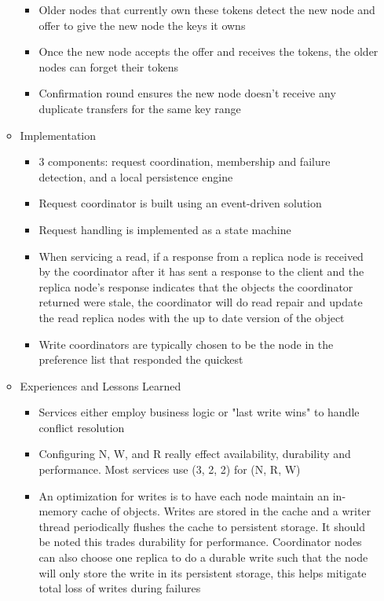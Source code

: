 \documentclass[a4paper]{article}
\begin{document}
\begin{itemize}
\begin{itemize}
\begin{itemize}
\item Older nodes that currently own these tokens detect the new node and offer to give the new node the keys it owns

\item Once the new node accepts the offer and receives the tokens, the older nodes can forget their tokens

\item Confirmation round ensures the new node doesn't receive any duplicate transfers for the same key range
\end{itemize}

\item Implementation
\begin{itemize}
\item 3 components: request coordination, membership and failure detection, and a local persistence engine

\item Request coordinator is built using an event-driven solution

\item Request handling is implemented as a state machine

\item When servicing a read, if a response from a replica node is received by the coordinator after it has sent a response to the client and the replica node's response indicates that the objects the coordinator returned were stale, the coordinator will do read repair and update the read replica nodes with the up to date version of the object

\item Write coordinators are typically chosen to be the node in the preference list that responded the quickest
\end{itemize}

\item Experiences and Lessons Learned
\begin{itemize}
\item Services either employ business logic or "last write wins" to handle conflict resolution

\item Configuring N, W, and R really effect availability, durability and performance. Most services use (3, 2, 2) for (N, R, W)

\item An optimization for writes is to have each node maintain an in-memory cache of objects. Writes are stored in the cache and a writer thread periodically flushes the cache to persistent storage. It should be noted this trades durability for performance. Coordinator nodes can also choose one replica to do a durable write such that the node will only store the write in its persistent storage, this helps mitigate total loss of writes during failures


\end{itemize}
\end{itemize}
\end{itemize}
\end{document}
